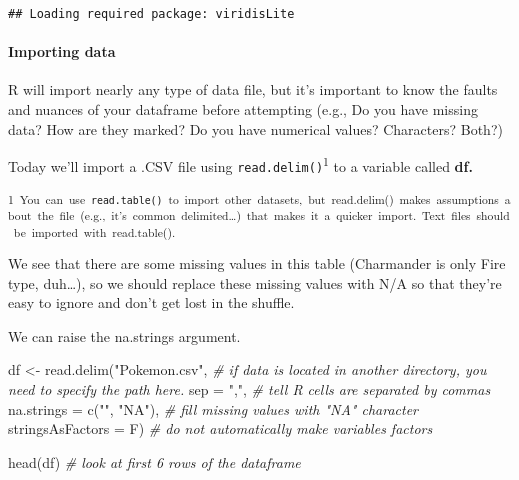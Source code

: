 \documentclass[
]{article}
\newenvironment{Shaded}{\begin{snugshade}}{\end{snugshade}}
\newcommand{\AttributeTok}[1]{\textcolor[rgb]{0.77,0.63,0.00}{#1}}
\newcommand{\CommentTok}[1]{\textcolor[rgb]{0.56,0.35,0.01}{\textit{#1}}}
\newcommand{\FunctionTok}[1]{\textcolor[rgb]{0.00,0.00,0.00}{#1}}
\newcommand{\NormalTok}[1]{#1}
\newcommand{\OtherTok}[1]{\textcolor[rgb]{0.56,0.35,0.01}{#1}}
\newcommand{\StringTok}[1]{\textcolor[rgb]{0.31,0.60,0.02}{#1}}
\begin{document}
\begin{verbatim}
## Loading required package: viridisLite
\end{verbatim}

\hypertarget{importing-data}{%
\paragraph{Importing data}\label{importing-data}}

R will import nearly any type of data file, but it's important to know
the faults and nuances of your dataframe before attempting (e.g., Do you
have missing data? How are they marked? Do you have numerical values?
Characters? Both?)

Today we'll import a .CSV file using
\texttt{read.delim()}\textsuperscript{1} to a variable called
\textbf{df.}

\textsubscript{1~You~can~use~\texttt{read.table()}~to~import~other~datasets,~but~read.delim()~makes~assumptions~about~the~file~(e.g.,~it's~common~delimited\ldots)~that~makes~it~a~quicker~import.~Text~files~should~be~imported~with~read.table().}

We see that there are some missing values in this table (Charmander is
only Fire type, duh\ldots), so we should replace these missing values
with N/A so that they're easy to ignore and don't get lost in the
shuffle.

We can raise the na.strings argument.

\begin{Shaded}
\begin{Highlighting}[]
\NormalTok{df }\OtherTok{\textless{}{-}} \FunctionTok{read.delim}\NormalTok{(}\StringTok{"Pokemon.csv"}\NormalTok{,                  }\CommentTok{\# if data is located in another directory, you need to specify the path here. }
                   \AttributeTok{sep =} \StringTok{","}\NormalTok{,                    }\CommentTok{\# tell R cells are separated by commas}
                   \AttributeTok{na.strings =} \FunctionTok{c}\NormalTok{(}\StringTok{""}\NormalTok{, }\StringTok{"NA"}\NormalTok{),     }\CommentTok{\# fill missing values with "NA" character}
                   \AttributeTok{stringsAsFactors =}\NormalTok{ F)         }\CommentTok{\# do not automatically make variables factors}


\FunctionTok{head}\NormalTok{(df)                                         }\CommentTok{\# look at first 6 rows of the dataframe}
\end{Highlighting}
\end{Shaded}
\end{document}
